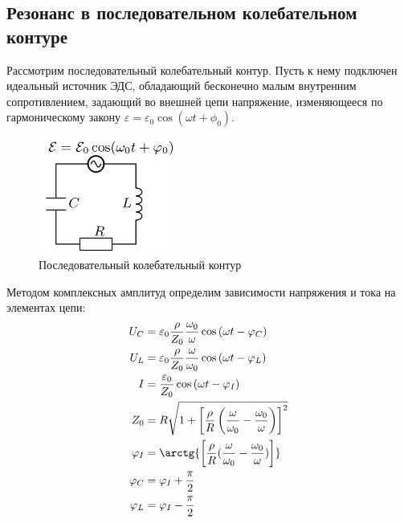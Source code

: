 \subsection*{Резонанс в последовательном колебательном контуре}

Рассмотрим последовательный колебательный контур. Пусть к нему подключен идеальный источник ЭДС, обладающий бесконечно малым внутренним сопротивлением, задающий во внешней цепи напряжение, изменяющееся по гармоническому закону $\varepsilon = \varepsilon_0 \cos{\left(\omega t + \phi_0\right)}$.

\begin{figure}[H]
	\vspace{-10pt}
	\centering
	\includegraphics[width=0.4\textwidth]{../res/seq_contour.png}
	\caption{Последовательный колебательный контур}
	\label{fig:seq_contour}
\end{figure}

Методом комплексных амплитуд определим зависимости напряжения и тока на элементах цепи:
\begin{equation*}
	\begin{split}
		U_C &= \varepsilon_0 \frac{\rho}{Z_0} \frac{\omega_0}{\omega} \cos \left(\omega t - \varphi_C\right) \\
		U_L &= \varepsilon_0 \frac{\rho}{Z_0} \frac{\omega}{\omega_0} \cos \left(\omega t - \varphi_L\right) \\
		I &= \frac{\varepsilon_0}{Z_0} \cos \left(\omega t - \varphi_I\right) \\
		Z_0 &= R \sqrt{1 + \left[\frac{\rho}{R} \left(\frac{\omega}{\omega_0} - \frac{\omega_0}{\omega}\right)\right]^2} \\
		\varphi_I &= \arctg{\left[\frac{\rho}{R} (\frac{\omega}{\omega_0} - \frac{\omega_0}{\omega})\right]} \\
		\varphi_C &= \varphi_I + \frac{\pi}{2} \\
		\varphi_L &= \varphi_I - \frac{\pi}{2}
	\end{split}
\end{equation*}

